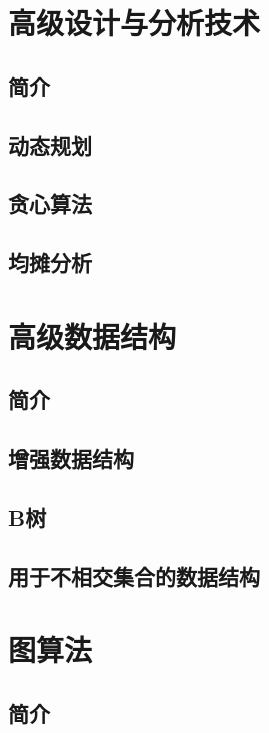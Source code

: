 \documentclass[lang=cn,newtx,10pt,scheme=chinese]{elegantbook}
\begin{document}
\part{高级设计与分析技术}

\chapter*{简介}

\chapter{动态规划}

\chapter{贪心算法}

\chapter{均摊分析}

\part{高级数据结构}

\chapter*{简介}

\chapter{增强数据结构}

\chapter{B树}

\chapter{用于不相交集合的数据结构}

\part{图算法}

\chapter*{简介}
\end{document}
